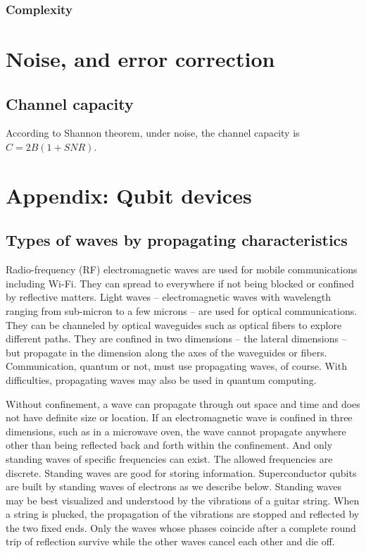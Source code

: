 \documentclass[Letter,11pt]{book}
\begin{document}
\subsection{Complexity}

\chapter{Noise, and error correction}
\section{Channel capacity}
According to Shannon theorem, under noise, the channel capacity is $C = 2B (1+SNR)$.


\chapter{Appendix: Qubit devices}\label{A-qubit}
\section{Types of waves by propagating characteristics}
Radio-frequency (RF) electromagnetic waves are used for mobile communications including Wi-Fi. They can spread to everywhere if not being blocked or confined by reflective matters. Light waves -- electromagnetic waves with wavelength ranging from sub-micron to a few microns -- are used for optical communications. They can be channeled by optical waveguides such as optical fibers to explore different paths. They are confined in two dimensions -- the lateral dimensions -- but propagate in the dimension along the axes of the waveguides or fibers. Communication, quantum or not, must use propagating waves, of course. With difficulties, propagating waves may also be used in quantum computing.

Without confinement, a wave can propagate through out space and time and does not have definite size or location. If an electromagnetic wave is confined in three dimensions, such as in a microwave oven, the wave cannot propagate anywhere other than being reflected back and forth within the confinement. And only standing waves of specific frequencies can exist. The allowed frequencies are discrete. Standing waves are good for storing information. Superconductor qubits are built by standing waves of electrons as we describe below. Standing waves may be best visualized and understood by the vibrations of a guitar string. When a string is plucked, the propagation of the vibrations are stopped and reflected by the two fixed ends. Only the waves whose phases coincide after a complete round trip of reflection survive while the other waves cancel each other and die off.
\end{document}
